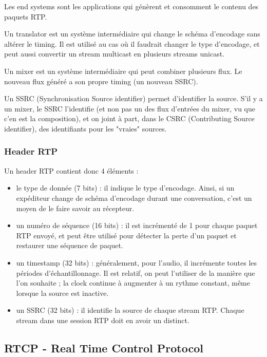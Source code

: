 \documentclass[10pt,a4paper]{report}
\begin{document}
		Les end systems sont les applications qui génèrent et consomment le contenu des paquets RTP. 
				
		Un translator est un système intermédiaire qui change le schéma d'encodage sans altérer le timing. Il est utilisé au cas où il faudrait changer le type d'encodage, et peut aussi convertir un stream multicast en plusieurs streams unicast.
		
		Un mixer est un système intermédiaire qui peut combiner plusieurs flux. Le nouveau flux généré a son propre timing (un nouveau SSRC).
		
		Un SSRC (Synchronisation Source identifier) permet d'identifier la source. S'il y a un mixer, le SSRC l'identifie (et non pas un des flux d'entrées du mixer, vu que c'en est la composition), et on joint à part, dans le CSRC (Contributing Source identifier), des identifiants pour les "vraies" sources.
			\subsubsection{Header RTP}
			
			Un header RTP contient donc 4 éléments :
			
			\begin{itemize}
				\item le type de donnée (7 bits) : il indique le type d'encodage. Ainsi, si un expéditeur change de schéma d'encodage durant une conversation, c'est un moyen de le faire savoir au récepteur.
				
				\item un numéro de séquence (16 bits) : il est incrémenté de 1 pour chaque paquet RTP envoyé, et peut être utilisé pour détecter la perte d'un paquet et restaurer une séquence de paquet.
				
				\item un timestamp (32 bits) : généralement, pour l'audio, il incrémente toutes les périodes d'échantillonnage.  Il est relatif, on peut l'utiliser de la manière que l'on souhaite ; la clock continue à augmenter à un rythme constant, même lorsque la source est inactive.
				
				\item un SSRC (32 bits) : il identifie la source de chaque stream RTP. Chaque stream dans une session RTP doit en avoir un distinct.
			\end{itemize}					
			
		
		\subsection{RTCP - Real Time Control Protocol}
		
\end{document}

